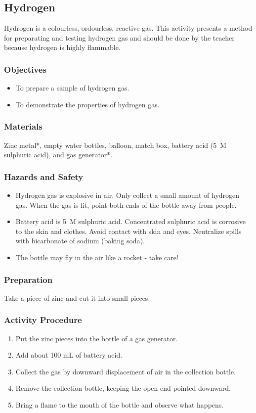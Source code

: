 \subsection{Hydrogen}

Hydrogen is a colourless, ordourless, reactive gas. This activity presents a method for preparating and testing hydrogen gas and should be done by the teacher because hydrogen is highly flammable.

\subsubsection*{Objectives}
\begin{itemize}
\item{To prepare a sample of hydrogen gas.}
\item{To demonstrate the properties of hydrogen gas.}
\end{itemize}

\subsubsection*{Materials}
Zinc metal*, empty water bottles, balloon, match box, battery acid (5~M sulphuric acid), and gas generator*.

\subsubsection*{Hazards and Safety}
\begin{itemize}
\item{Hydrogen gas is explosive in air. Only collect a small amount of hydrogen gas. When the gas is lit, point both ends of the bottle away from people.}
\item{Battery acid is 5~M sulphuric acid. Concentrated sulphuric acid is corrosive to the skin and clothes. Avoid contact with skin and eyes. Neutralize spills with bicarbonate of sodium (baking soda).}
\item{The bottle may fly in the air like a rocket - take care!}
\end{itemize}

\subsubsection*{Preparation}
Take a piece of zinc and cut it into small pieces.

\subsubsection*{Activity Procedure}
\begin{enumerate}
\item{Put the zinc pieces into the bottle of a gas generator.}
\item{Add about 100 mL of battery acid.}
\item{Collect the gas by downward displacement of air in the collection bottle.}
\item{Remove the collection bottle, keeping the open end pointed downward.}
\item{Bring a flame to the mouth of the bottle and observe what happens.}
\end{enumerate}

